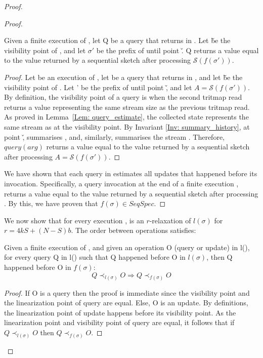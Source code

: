 \begin{proof}
\begin{proof}
\begin{lemma} \label{Lem: query_correctness}
Given a finite execution \s of \mysketch, let Q be a query that returns in \s. Let \v be the visibility point of \Q, and let $\sigma'$ be the prefix of \s until point \v. Q returns a value equal to the value returned 
by a sequential sketch after processing $\mathcal{S}\left(f(\sigma')\right)$.

\end{lemma}
\begin{proof}
Let \s be an execution of \mysketch, let \Q be a query that returns in \s, and let \v be the visibility point of \Q. Let \s' be the prefix of \s until point \v, and let \(A=\mathcal{S}(f(\sigma'))\).
By definition, the visibility point of a query is when the second tritmap read returns a value representing the same stream size as the previous tritmap read. As proved in Lemma~\ref{Lem: query_estimate}, the collected state represents the same stream as \mysketch at the visibility point. By Invariant \ref{Inv: summary_history}, at point \v, \mysketch summarises \fstag, and, similarly, summarises the stream \A. 
Therefore, \(query(arg)\) returns a value equal to the value returned by a sequential sketch after processing \(A=\mathcal{S}(f(\sigma'))\).
\end{proof}

We have shown that each query in \fs estimates all updates that happened before its invocation. Specifically, a query invocation at the end of a finite execution \s,
returns a value equal to the value returned by a sequential sketch after processing
\A. By this, we have proven that $ f(\sigma) \in SeqSpec$.
\end{proof}

We now show that for every execution \s, \fs  is an \(r\)-relaxation of \(l(\sigma)\) for \(r = 4kS + (N-S)b\).
The order between operations satisfies:

\begin{lemma}\label{Lem: op_order}
Given a finite execution \s of \mysketch, and given an operation O (query or update) in l(\s), for every query Q in l(\s) such that Q happened before O in \(l(\sigma)\), then Q happened before O in \(f(\sigma)\):  \[Q \prec_{l(\sigma)} O \Rightarrow  Q \prec_{f(\sigma)} O\]
\end{lemma}
\begin{proof}
If O is a query then the proof is immediate since the visibility point and the linearization point of query are equal. Else, O is an update. By definitions, the linearization point of update happens before its visibility point. As the linearization point and visibility point of query \Q are equal, it follows that if \(Q \prec_{l(\sigma)} O\) then \(Q \prec_{f(\sigma)} O\).
\end{proof}


\end{proof}
